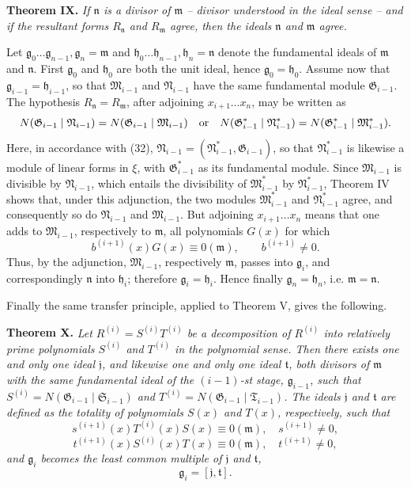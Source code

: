 \documentclass[11pt]{article}
\providecommand{\Gmod}{\mathfrak G}
\providecommand{\Mmod}{\mathfrak M}
\providecommand{\Nmod}{\mathfrak N}
\providecommand{\Smod}{\mathfrak S}
\providecommand{\mideal}{\mathfrak m}
\providecommand{\nideal}{\mathfrak n}
\providecommand{\gideal}{\mathfrak g}
\providecommand{\hideal}{\mathfrak h}
\providecommand{\jideal}{\mathfrak j}
\providecommand{\tideal}{\mathfrak t}
\begin{document}
\medskip
\noindent\textbf{Theorem IX.} \emph{If $\nideal$ is a divisor of $\mideal$ -- divisor understood in the ideal sense -- and if the resultant forms $R_\nideal$ and $R_\mideal$ agree, then the ideals $\nideal$ and $\mideal$ agree.}

Let $\gideal_0\ldots\gideal_{n-1},\gideal_n=\mideal$ and $\hideal_0\ldots\hideal_{n-1},\hideal_n=\nideal$ denote the fundamental ideals of $\mideal$ and $\nideal$. First $\gideal_0$ and $\hideal_0$ are both the unit ideal, hence $\gideal_0=\hideal_0$. Assume now that $\gideal_{i-1}=\hideal_{i-1}$, so that $\Mmod_{i-1}$ and $\Nmod_{i-1}$ have the same fundamental module $\Gmod_{i-1}$. The hypothesis $R_\nideal=R_\mideal$, after adjoining $x_{i+1}\ldots x_n$, may be written as
\[
 N(\Gmod_{i-1}\mid\Nmod_{i-1})=N(\Gmod_{i-1}\mid\Mmod_{i-1})
 \quad\hbox{or}\quad
 N(\Gmod^*_{i-1}\mid\Nmod^*_{i-1})=N(\Gmod^*_{i-1}\mid\Mmod^*_{i-1}).
\]
Here, in accordance with (32), $\Nmod_{i-1}=(\Nmod^*_{i-1},\Gmod_{i-1})$, so that $\Nmod^*_{i-1}$ is likewise a module of linear forms in $\xi$, with $\Gmod^*_{i-1}$ as its fundamental module. Since $\Mmod_{i-1}$ is divisible by $\Nmod_{i-1}$, which entails the divisibility of $\Mmod^*_{i-1}$ by $\Nmod^*_{i-1}$, Theorem IV shows that, under this adjunction, the two modules $\Mmod^*_{i-1}$ and $\Nmod^*_{i-1}$ agree, and consequently so do $\Nmod_{i-1}$ and $\Mmod_{i-1}$. But adjoining $x_{i+1}\ldots x_n$ means that one adds to $\Mmod_{i-1}$, respectively to $\mideal$, all polynomials $G(x)$ for which
\[
 b^{(i+1)}(x)G(x)\equiv0(\mideal),\qquad b^{(i+1)}\ne0.
\]
Thus, by the adjunction, $\Mmod_{i-1}$, respectively $\mideal$, passes into $\gideal_i$, and correspondingly $\nideal$ into $\hideal_i$; therefore $\gideal_i=\hideal_i$. Hence finally $\gideal_n=\hideal_n$, i.e. $\mideal=\nideal$.

Finally the same transfer principle, applied to Theorem V, gives the following.

\medskip
\noindent\textbf{Theorem X.} \emph{Let $R^{(i)}=S^{(i)}T^{(i)}$ be a decomposition of $R^{(i)}$ into relatively prime polynomials $S^{(i)}$ and $T^{(i)}$ in the polynomial sense. Then there exists one and only one ideal $\jideal$, and likewise one and only one ideal $\tideal$, both divisors of $\mideal$ with the same fundamental ideal of the $(i-1)$-st stage, $\gideal_{i-1}$, such that $S^{(i)}=N(\Gmod_{i-1}\mid\Smod_{i-1})$ and $T^{(i)}=N(\Gmod_{i-1}\mid\mathfrak T_{i-1})$. The ideals $\jideal$ and $\tideal$ are defined as the totality of polynomials $S(x)$ and $T(x)$, respectively, such that}
\[
 s^{(i+1)}(x)T^{(i)}(x)S(x)\equiv0(\mideal),\quad s^{(i+1)}\ne0,
\]
\[
 t^{(i+1)}(x)S^{(i)}(x)T(x)\equiv0(\mideal),\quad t^{(i+1)}\ne0,
\]
\emph{and $\gideal_i$ becomes the least common multiple of $\jideal$ and $\tideal$,}
\[
 \gideal_i=[\jideal,\tideal].
\]
\end{document}
